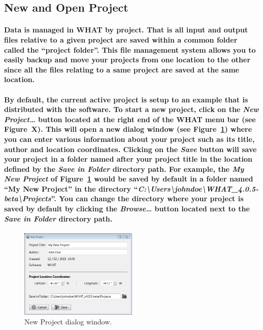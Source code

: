 \documentclass[10pt, letterpaper, fleqn]{report}
\begin{document}
\subsection{New and Open Project}

\paragraph{Data is managed in WHAT by project. That is all input and output files relative to a given project are saved within a common folder called the ``project folder''. This file management system allows you to easily backup and move your projects from one location to the other since all the files relating to a same project are saved at the same location.}

\paragraph{By default, the current active project is setup to an example that is distributed with the software. To start a new project, click on the \textsl{New Project\dots} button located at the right end of the WHAT menu bar (see Figure~X). This will open a new dialog window (see Figure~\ref{fig:new_proj_win}) where you can enter various information about your project such as its title, author and location coordinates. Clicking on the \textsl{Save} button will save your project in a folder named after your project title in the location defined by the \textsl{Save in Folder} directory path. For example, the \textsl{My New Project} of Figure~\ref{fig:new_proj_win} would be saved by default in a folder named ``My New Project'' in the directory ``\textsl{C:\textbackslash{}Users\textbackslash{}johndoe\textbackslash{}WHAT\_4.0.5-beta\textbackslash{}Projects}''. You can change the directory where your project is saved by default by clicking the \textsl{Browse\dots} button located next to the \textsl{Save in Folder} directory path.}



\begin{figure}[h!]
\centering
\includegraphics[width=0.5\textwidth]{WHAT_Screenshot_newproject}
\caption[New Project dialog window.]{New Project dialog window.}
\label{fig:new_proj_win}
\end{figure}
\end{document}
